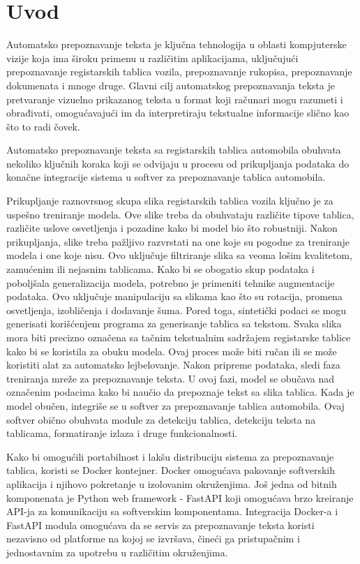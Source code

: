 \documentclass[a4paper,12pt]{article}
\begin{document}
	\section{Uvod}
	Automatsko prepoznavanje teksta je ključna tehnologija u oblasti kompjuterske vizije koja ima široku primenu u različitim aplikacijama, uključujući prepoznavanje registarskih tablica vozila, prepoznavanje rukopisa, prepoznavanje dokumenata i mnoge druge. Glavni cilj automatskog prepoznavanja teksta je pretvaranje vizuelno prikazanog teksta u format koji računari mogu razumeti i obrađivati, omogućavajući im da interpretiraju tekstualne informacije slično kao što to radi čovek.
		
	Automatsko prepoznavanje teksta sa registarskih tablica automobila obuhvata nekoliko ključnih koraka koji se odvijaju u procesu od prikupljanja podataka do konačne integracije sistema u softver za prepoznavanje tablica automobila.
	
	Prikupljanje raznovrsnog skupa slika registarskih tablica vozila ključno je za uspešno treniranje modela. Ove slike treba da obuhvataju različite tipove tablica, različite uslove osvetljenja i pozadine kako bi model bio što robustniji. Nakon prikupljanja, slike treba pažljivo razvrstati na one koje su pogodne za treniranje modela i one koje nisu. Ovo uključuje filtriranje slika sa veoma lošim kvalitetom, zamućenim ili nejasnim tablicama. Kako bi se obogatio skup podataka i poboljšala generalizacija modela, potrebno je primeniti tehnike augmentacije podataka. Ovo uključuje manipulaciju sa slikama kao što su rotacija, promena osvetljenja, izobličenja i dodavanje šuma. Pored toga, sintetički podaci se mogu generisati korišćenjem programa za generisanje tablica sa tekstom. Svaka slika mora biti precizno označena sa tačnim tekstualnim sadržajem registarske tablice kako bi se koristila za obuku modela. Ovaj proces može biti ručan ili se može koristiti alat za automatsko lejbelovanje. Nakon pripreme podataka, sledi faza treniranja mreže za prepoznavanje teksta. U ovoj fazi, model se obučava nad označenim podacima kako bi naučio da prepoznaje tekst sa slika tablica. Kada je model obučen, integriše se u softver za prepoznavanje tablica automobila. Ovaj softver obično obuhvata module za detekciju tablica, detekciju teksta na tablicama, formatiranje izlaza i druge funkcionalnosti.
	
	Kako bi omogućili portabilnost i lakšu distribuciju sistema za prepoznavanje tablica, koristi se Docker kontejner. Docker omogućava pakovanje softverskih aplikacija i njihovo pokretanje u izolovanim okruženjima. Još jedna od bitnih komponenata je Python web framework - FastAPI koji omogućava brzo kreiranje API-ja za komunikaciju sa softverskim komponentama. Integracija Docker-a i FastAPI modula omogućava da se servis za prepoznavanje teksta koristi nezavisno od platforme na kojoj se izvršava, čineći ga pristupačnim i jednostavnim za upotrebu u različitim okruženjima.
	\newpage
	
\end{document}
